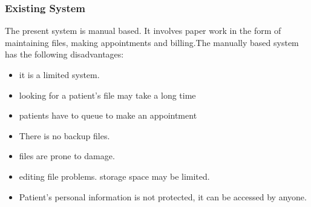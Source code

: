 \documentclass[11 pt]{article}
\begin{document}
\subsubsection{Existing System}
The present system is manual based. It involves paper work in the form of maintaining files, making appointments and billing.The manually based system has the following disadvantages:
\begin{itemize}
\item
it is a limited system.
\item
looking for a patient's file may take a long time
\item
patients have to queue to make an appointment
\item
There is no backup files.
\item
files are prone to damage.
\item
editing file problems.
storage space may be limited.
\item
Patient's personal information is not protected, it can be accessed by anyone.
\end{itemize}
\end{document}
